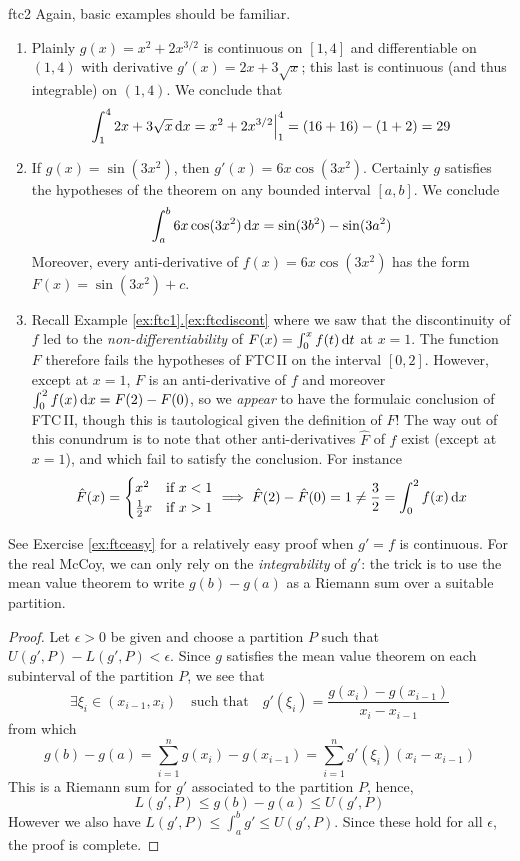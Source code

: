 \begin{examples}{}{ftc2}
Again, basic examples should be familiar.
\begin{enumerate}
  \item Plainly $g(x)=x^2+2x^{3/2}$ is continuous on $[1,4]$ and differentiable on $(1,4)$ with derivative $g'(x)=2x+3\sqrt x$; this last is continuous (and thus integrable) on $(1,4)$. We conclude that
  \[\int_1^42x+3\sqrt x\,{\mathrm{d} x} =x^2+2x^{3/2}\Big|_1^4 =(16+16)-(1+2)=29\] 
  
  \item If $g(x)=\sin(3x^2)$, then $g'(x)=6x\cos(3x^2)$. Certainly $g$ satisfies the hypotheses of the theorem on any bounded interval $[a,b]$. We conclude
	\[\int_a^b 6x\cos(3x^2)\,{\mathrm{d} x}=\sin(3b^2)-\sin(3a^2)\]
	Moreover, every anti-derivative of $f(x)=6x\cos(3x^2)$ has the form $F(x)=\sin(3x^2)+c$.
	
	\item\label{ex:ftcdiscont2} Recall Example \hyperref[ex:ftcdiscont]{\ref*{ex:ftc1}.\ref*{ex:ftcdiscont}} where we saw that the discontinuity of $f$ led to the \emph{non-differentiability} of $F(x)=\int_0^xf(t)\,{\mathrm{d} t}$ at $x=1$. The function $F$ therefore fails the hypotheses of FTC\,II on the interval $[0,2]$.\smallbreak
	However, except at $x=1$, $F$ is an anti-derivative of $f$ and moreover $\int_0^2f(x)\,{\mathrm{d} x}=F(2)-F(0)$, so we \emph{appear} to have the formulaic conclusion of FTC\,II, though this is tautological given the definition of $F$!\smallbreak
	The way out of  this conundrum is to note that other anti-derivatives $\hat F$ of $f$ exist (except at $x=1$), and which fail to satisfy the conclusion. For instance
	  \[\hat F(x)=\begin{cases}
	  x^2&\text{if }x<1\\
	  \frac 12x&\text{if }x>1
	  \end{cases}\implies \hat F(2)-\hat F(0)=1\neq \frac 32=\int_0^2f(x)\,{\mathrm{d} x}\]
\end{enumerate}
\end{examples}


\goodbreak


See Exercise \ref{ex:ftceasy} for a relatively easy proof when $g'=f$ is continuous. For the real McCoy, we can only rely on the \emph{integrability} of $g'$: the trick is to use the mean value theorem to write $g(b)-g(a)$ as a Riemann sum over a suitable partition.

\begin{proof}
Let $\epsilon>0$ be given and choose a partition $P$ such that $U(g',P)-L(g',P)<\epsilon$. Since $g$ satisfies the mean value theorem on each subinterval of the partition $P$, we see that
\[\exists \xi_i\in(x_{i-1},x_i)\quad\text{such that} \quad g'(\xi_i)=\frac{g(x_i)-g(x_{i-1})}{x_i-x_{i-1}}\]
from which
\[g(b)-g(a)=\sum_{i=1}^ng(x_i)-g(x_{i-1})=\sum_{i=1}^ng'(\xi_i)(x_i-x_{i-1})\]
This is a Riemann sum for $g'$ associated to the partition $P$, hence,
\[L(g',P)\le g(b)-g(a)\le U(g',P)\]
However we also have $L(g',P)\le \int_a^bg'\le U(g',P)$. Since these hold for all $\epsilon$, the proof is complete.
\end{proof}


